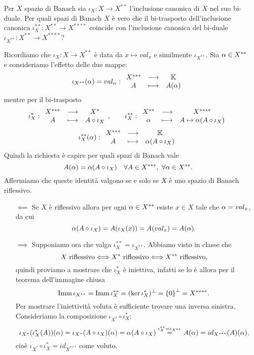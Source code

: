 \documentclass[a4paper]{article}
\begin{document}


\begin{exercise}
Per $X$ spazio di Banach sia $\iota_X:X\to X^{\ast\ast}$ l'inclusione canonica di $X$ nel suo bi-duale. Per quali spazi di Banach $X$ \`e vero che il bi-trasposto dell'inclusione canonica $\iota_X^{\ast\ast}:X^{\ast\ast}\to X^{\ast\ast\ast\ast}$ coincide con l'inclusione canonica del bi-duale $\iota_{X^{\ast\ast}}:X^{\ast\ast}\to X^{\ast\ast\ast\ast}$?
\end{exercise}
\begin{solution}
Ricordiamo che $\iota_X:X\to X^{\ast\ast}$ \`e data da $x\mapsto val_x$ e similmente $\iota_{X^{\ast\ast}}$. Sia $\alpha\in X^{\ast\ast}$ e consideriamo l'effetto delle due mappe:
\[\iota_{X^{\ast\ast}}(\alpha)=val_\alpha:\begin{array}{ccc} {X^{\ast\ast\ast}} & \longrightarrow & {\mathbb{K}}\\ {A} & \longmapsto & {A(\alpha)} \end{array}\]
mentre per il bi-trasposto
\[\iota_{X}^{\ast}:\begin{array}{ccc} {X^{\ast\ast\ast}} & \longrightarrow & {X^\ast}\\ {A} & \longmapsto & {A\circ \iota_X} \end{array},\qquad \iota_{X}^{\ast\ast}:\begin{array}{ccc} {X^{\ast\ast}} & \longrightarrow & {X^{\ast\ast\ast\ast}}\\ {\alpha} & \longmapsto & {A\mapsto \alpha(A\circ \iota_X)} \end{array}\]
\[\iota_{X}^{\ast\ast}(\alpha):\begin{array}{ccc} {X^{\ast\ast\ast}} & \longrightarrow & {\mathbb{K}}\\ {A} & \longmapsto & {\alpha(A\circ \iota_X)} \end{array}\]
Quindi la richiesta \`e capire per quali spazi di Banach vale
\[A(\alpha)=\alpha(A\circ \iota_X)\quad \forall A\in X^{\ast\ast\ast},\ \forall \alpha\in X^{\ast\ast}.\]
Affermiamo che queste identit\`a valgono se e solo se $X$ \`e uno spazio di Banach riflessivo.
\setlength{\leftmargini}{0cm}
\begin{itemize}
\item[$\boxed{\impliedby}$] Se $X$ \`e riflessivo allora per ogni $\alpha\in X^{\ast\ast}$ esiste $x\in X$ tale che $\alpha=val_x$, da cui
\[\alpha(A\circ \iota_X)=A(\iota_X(x))=A(val_x)=A(\alpha).\]
\item[$\boxed{\implies}$] Supponiamo ora che valga $\iota_X^{\ast\ast}=\iota_{X^{\ast\ast}}$. Abbiamo visto in classe che 
\[X\text{ riflessivo}\Longleftrightarrow X^\ast\text{ riflessivo}\Longleftrightarrow X^{\ast\ast}\text{ riflessivo},\] 
quindi proviamo a mostrare che $\iota_X^\ast$ \`e iniettiva, infatti se lo \`e allora per il teorema dell'immagine chiusa
\[\operatorname{Imm} \iota_{X^{\ast\ast}}=\operatorname{Imm} \iota_X^{\ast\ast}=(\ker \iota_X^{\ast})^\perp=\left\{{0}\right\}^\perp=X^{\ast\ast\ast\ast}.\]
Per mostrare l'iniettivit\`a voluta \`e sufficiente trovare una inversa sinistra. Consideriamo la composizione $\iota_{X^\ast}\circ \iota_X^\ast$:
\[\iota_{X^\ast}(\iota_X^\ast(A))(\alpha)=\iota_{X^\ast}(A\circ \iota_X)(\alpha)=\alpha(A\circ \iota_X)\overset{\iota_X^{\ast\ast}=\iota_{X^{\ast\ast}}}=A(\alpha)=id_{X^{\ast\ast\ast}}(A)(\alpha),\]
cio\`e $\iota_{X^\ast}\circ \iota_X^\ast=id_{X^{\ast\ast\ast}}$ come voluto.
\end{itemize}
\setlength{\leftmargini}{0.5cm}
\end{solution}
\end{document}
